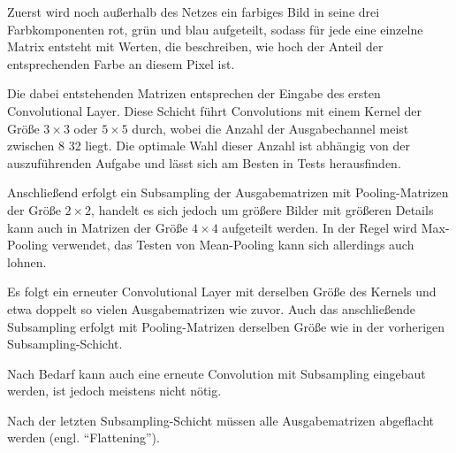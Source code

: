 \documentclass[12pt,a4]{article}
\begin{document}
Zuerst wird noch außerhalb des Netzes ein farbiges Bild in seine drei Farbkomponenten rot, grün und blau aufgeteilt, sodass für jede eine einzelne Matrix entsteht mit Werten, die beschreiben, wie hoch der Anteil der entsprechenden Farbe an diesem Pixel ist.

Die dabei entstehenden Matrizen entsprechen der Eingabe des ersten Convolutional Layer. Diese Schicht führt Convolutions mit einem Kernel der Größe $3 \times 3$ oder $5 \times 5$ durch, wobei die Anzahl der Ausgabechannel meist zwischen 8 32 liegt. Die optimale Wahl dieser Anzahl ist abhängig von der auszuführenden Aufgabe und lässt sich am Besten in Tests herausfinden.

Anschließend erfolgt ein Subsampling der Ausgabematrizen mit Pooling-Matrizen der Größe $2 \times 2$, handelt es sich jedoch um größere Bilder mit größeren Details kann auch in Matrizen der Größe $4 \times 4$ aufgeteilt werden. In der Regel wird Max-Pooling verwendet, das Testen von Mean-Pooling kann sich allerdings auch lohnen.

Es folgt ein erneuter Convolutional Layer mit derselben Größe des Kernels und etwa doppelt so vielen Ausgabematrizen wie zuvor. Auch das anschließende Subsampling erfolgt mit Pooling-Matrizen derselben Größe wie in der vorherigen Subsampling-Schicht.

Nach Bedarf kann auch eine erneute Convolution mit Subsampling eingebaut werden, ist jedoch meistens nicht nötig.

Nach der letzten Subsampling-Schicht müssen alle Ausgabematrizen abgeflacht werden (engl. \enquote{Flattening}).
\end{document}
